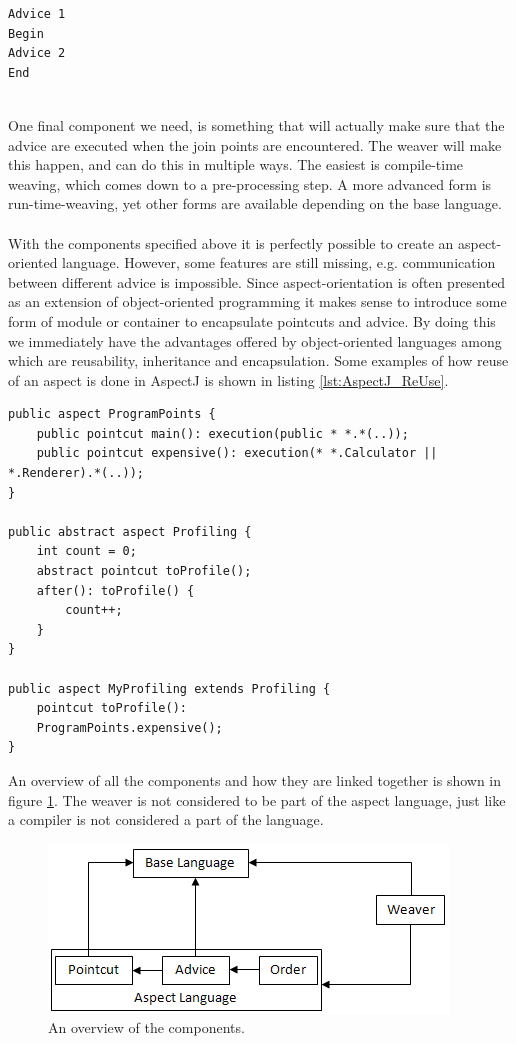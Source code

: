 \documentclass[a4paper]{report}
\begin{document}
\begin{minipage}{0.48\textwidth}
\begin{lstlisting}[caption=Output of the ordered advice.,label=lst:AspectJ_PrecedenceOutput]
Advice 1
Begin
Advice 2
End
\end{lstlisting}
\end{minipage}\\
One final component we need, is something that will actually make sure that the advice are executed when the join points are encountered. The weaver will make this happen, and can do this in multiple ways. The easiest is compile-time weaving, which comes down to a pre-processing step. A more advanced form is run-time-weaving, yet other forms are available depending on the base language.\\
\\
With the components specified above it is perfectly possible to create an aspect-oriented language. However, some features are still missing, e.g. communication between different advice is impossible. Since aspect-orientation is often presented as an extension of object-oriented programming it makes sense to introduce some form of module or container to encapsulate pointcuts and advice. By doing this we immediately have the advantages offered by object-oriented languages among which are reusability, inheritance and encapsulation. Some examples of how reuse of an aspect is done in AspectJ is shown in listing \ref{lst:AspectJ_ReUse}.
\begin{lstlisting}[caption=Possibilities to reuse aspects.,label=lst:AspectJ_ReUse]
public aspect ProgramPoints {
	public pointcut main(): execution(public * *.*(..));
	public pointcut expensive(): execution(* *.Calculator || *.Renderer).*(..));
}

public abstract aspect Profiling {
	int count = 0;
	abstract pointcut toProfile();
	after(): toProfile() {
		count++;
	}
}

public aspect MyProfiling extends Profiling {
	pointcut toProfile():
	ProgramPoints.expensive();
}
\end{lstlisting}
An overview of all the components and how they are linked together is shown in figure \ref{fig:Aspect_Components}. The weaver is not considered to be part of the aspect language, just like a compiler is not considered a part of the language.
\begin{figure}[h!]
\centering
\includegraphics[scale=0.7]{images/AOF/Components.png}
\caption{An overview of the components.}
\label{fig:Aspect_Components}
\end{figure}
\end{document}
